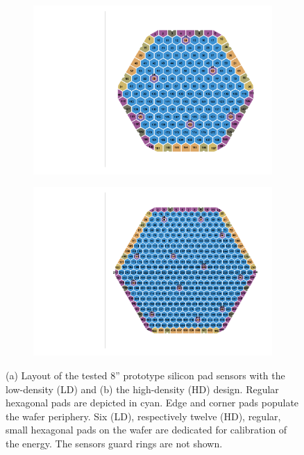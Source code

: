 \begin{figure}
	\captionsetup[subfigure]{aboveskip=-1pt,belowskip=-1pt}
	\centering
	\begin{subfigure}[b]{0.50\textwidth}
		\includegraphics[width=0.999\textwidth]{plots/ch_mapping/LD.pdf}
		\subcaption{
		}
	\end{subfigure}
	\hfill
	\begin{subfigure}[b]{0.48\textwidth}
		\includegraphics[width=0.999\textwidth]{plots/ch_mapping/HD.pdf}
		\subcaption{
		}
	\end{subfigure}    
	\caption{
        (a) Layout of the tested 8'' prototype silicon pad sensors with the low-density (LD) and (b) the high-density (HD) design.
		Regular hexagonal pads are depicted in cyan. 
		Edge and corner pads populate the wafer periphery. 
		Six (LD), respectively twelve (HD), regular, small hexagonal pads on the wafer are dedicated for calibration of the energy.
		The sensors guard rings are not shown.
	}
	\label{fig:Sensors}
\end{figure}
